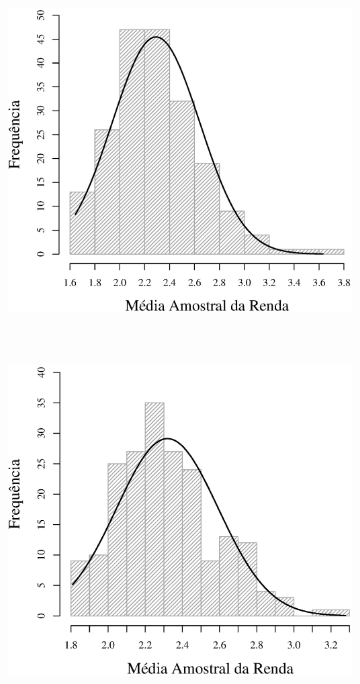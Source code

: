 \begin{figure}
\begin{subfigure}[b]{0.48\textwidth}
		\caption{}
		\label{fig:m8}
	\end{subfigure}
	\\
	\begin{subfigure}[b]{0.48\textwidth}
		\includegraphics[width=\textwidth]{plots/histogram_renda_m16.eps}
		\caption{}
		\label{fig:m16}
	\end{subfigure}
	~
	\begin{subfigure}[b]{0.48\textwidth}
		\includegraphics[width=\textwidth]{plots/histogram_renda_m30.eps}

\end{subfigure}
\end{figure}
